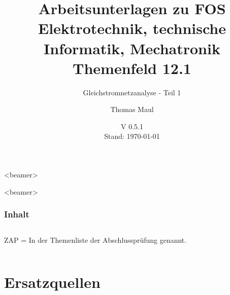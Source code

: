 \documentclass[aspectratio=169, ignorenonframetext]{beamer}
\title{Arbeitsunterlagen zu FOS Elektrotechnik, technische Informatik, Mechatronik Themenfeld 12.1}
\subtitle{Gleichstromnetzanalyse - Teil 1}
\date{V 0.5.1 \\ Stand: \today}%
\institute[BWS Hofheim]{Brühlwiesenschule, Hofheim}
\author{Thomas Maul}
\begin{document}
  \begin{frame}<beamer>
    \titlepage
  \end{frame}


\begin{frame}
  \partpage
\end{frame}
\begin{frame}<beamer>
  \frametitle{Inhalt}
  \begin{columns}
    \tableofcontents[sections={1-4},hidesubsections]%
    ZAP = In der Themenliste der Abschlussprüfung genannt.
    \tableofcontents[sections={5-},hidesubsections]%
  \end{columns}
\end{frame}
\section{Ersatzquellen}
\end{document}
